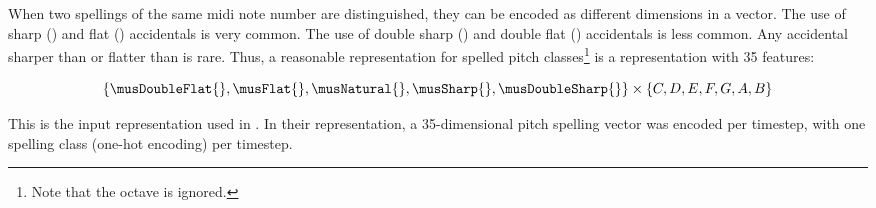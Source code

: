 
When two spellings of the same \gls{midi} note number are
distinguished, they can be encoded as different dimensions
in a vector. The use of sharp (\musSharp{}) and flat
(\musFlat{}) accidentals is very common. The use of double
sharp (\musDoubleSharp{}) and double flat (\musDoubleFlat{})
accidentals is less common. Any accidental sharper than
\musDoubleSharp{} or flatter than \musDoubleFlat{} is rare.
Thus, a reasonable representation for spelled pitch
classes\footnote{Note that the octave is ignored.} is a
representation with 35 features:

\begin{equation}
    \label{eq:pitch_spelling_35}
    \{\musDoubleFlat{}, \musFlat{}, \musNatural{}, \musSharp{},
    \musDoubleSharp{} \}
    \times 
    \{C, D, E, F, G, A, B \}    
\end{equation}

This is the input representation used in
\textcite{micchi2020not, micchi2021deep}. In their
representation, a 35-dimensional pitch spelling vector was
encoded per timestep, with one spelling class (one-hot
encoding) per timestep.
